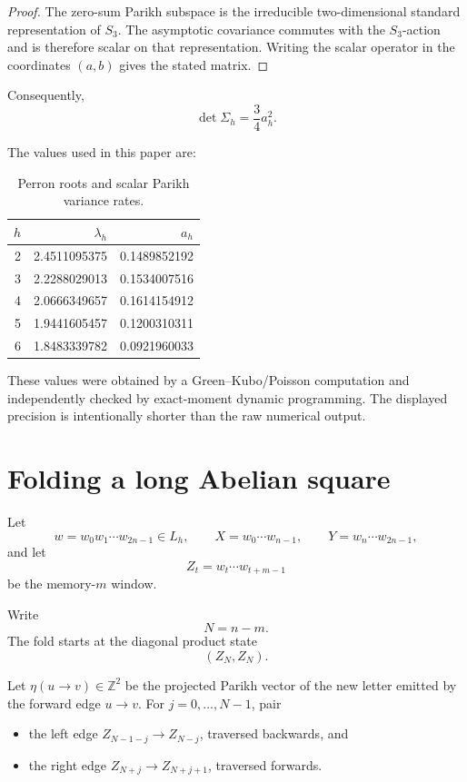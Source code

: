 \documentclass[12pt]{article}
\theoremstyle{definition}
\begin{document}
\begin{proof}
The zero-sum Parikh subspace is the irreducible two-dimensional standard representation of \(S_3\). The asymptotic covariance commutes with the \(S_3\)-action and is therefore scalar on that representation. Writing the scalar operator in the coordinates \((a,b)\) gives the stated matrix.
\end{proof}

Consequently,
\[
\det\Sigma_h=\frac34a_h^2.
\]

The values used in this paper are:

\begin{table}[h]
\centering
\begin{tabular}{rrr}
\toprule
\(h\) & \(\lambda_h\) & \(a_h\) \\
\midrule
2 & 2.4511095375 & 0.1489852192 \\
3 & 2.2288029013 & 0.1534007516 \\
4 & 2.0666349657 & 0.1614154912 \\
5 & 1.9441605457 & 0.1200310311 \\
6 & 1.8483339782 & 0.0921960033 \\
\bottomrule
\end{tabular}
\caption{Perron roots and scalar Parikh variance rates.}
\label{tab:ah}
\end{table}

These values were obtained by a Green--Kubo/Poisson computation and independently checked by exact-moment dynamic programming. The displayed precision is intentionally shorter than the raw numerical output.

\section{Folding a long Abelian square}
\label{sec:fold}

Let
\[
w=w_0w_1\cdots w_{2n-1}\in L_h,
\qquad
X=w_0\cdots w_{n-1},
\qquad
Y=w_n\cdots w_{2n-1},
\]
and let
\[
Z_t=w_t\cdots w_{t+m-1}
\]
be the memory-\(m\) window.

Write
\[
N=n-m.
\]
The fold starts at the diagonal product state
\[
(Z_N,Z_N).
\]

Let \(\eta(u\to v)\in\mathbb Z^2\) be the projected Parikh vector of the new letter emitted by the forward edge \(u\to v\). For \(j=0,\ldots,N-1\), pair
\begin{itemize}
\item the left edge \(Z_{N-1-j}\to Z_{N-j}\), traversed backwards, and
\item the right edge \(Z_{N+j}\to Z_{N+j+1}\), traversed forwards.
\end{itemize}
\end{document}
